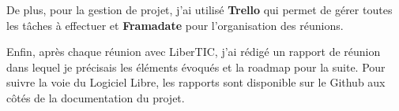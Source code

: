 De plus, pour la gestion de projet, j'ai utilisé \textbf{Trello} qui permet de gérer toutes les tâches à effectuer et \textbf{Framadate} pour l'organisation des réunions.

Enfin, après chaque réunion avec LiberTIC, j'ai rédigé un rapport de réunion dans lequel je précisais les éléments évoqués et la roadmap pour la suite. Pour suivre la voie du Logiciel Libre, les rapports sont disponible sur le Github aux côtés de la documentation du projet.